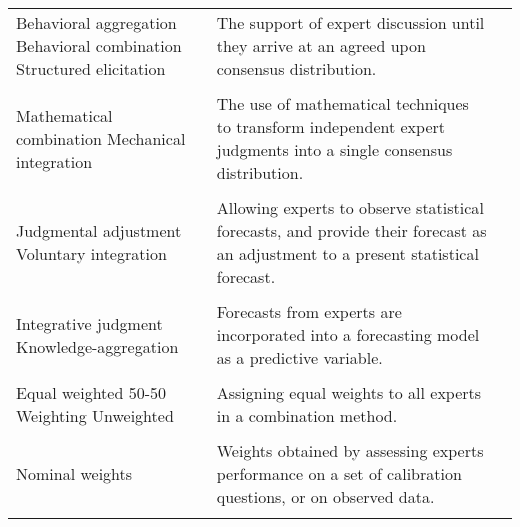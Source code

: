\documentclass[preprint]{elsarticle}
\begin{document}
\begin{table*}[ht!]
\begin{tabular}{L{6cm} L{8cm} L{4cm}}
         Behavioral aggregation\hspace{35mm}
         Behavioral combination\hspace{35mm}
         Structured elicitation & The support of expert discussion until they arrive at an agreed upon consensus distribution. & 
         \cite{hanea2018value,ISI:000296286100010,brito2012behavioral}\\
         \vspace{0.5mm}\\    
         
         Mathematical combination \hspace{35mm}
         Mechanical integration      & The use of mathematical techniques to transform independent expert judgments into a single consensus distribution. & 
         \cite{ISI:000296286100010,petrovic2006fuzzy}\\
         \vspace{0.5mm}\\    
         
         Judgmental adjustment
         Voluntary integration & Allowing experts to observe statistical forecasts, and provide their forecast as an adjustment to a present statistical forecast. & 
         \cite{alvarado2017expertise,huang2016improving,song2013combining,baecke2017investigating}\\
        \vspace{0.5mm}\\    
         
         Integrative judgment
         Knowledge-aggregation & Forecasts from experts are incorporated into a forecasting model as a predictive variable. & 
         \cite{baecke2017investigating,mak1996aggregating}\\ 
         \vspace{0.5mm}\\    
         
         Equal weighted  \hspace{35mm} 
         50-50 Weighting \hspace{35mm} 
         Unweighted & Assigning equal weights to all experts in a combination method. & 
         \cite{cooke2014out,hanea2018value,alvarado2017expertise,ISI:000327676900001,graefe2015accuracy}\\
         \vspace{0.5mm}\\    
         
         Nominal weights & Weights obtained by assessing experts performance on a set of calibration questions, or on observed data.
         & \cite{baldwin2015weighting}\\
        \vspace{0.5mm}\\     
         

\end{tabular}
\end{table*}
\end{document}
